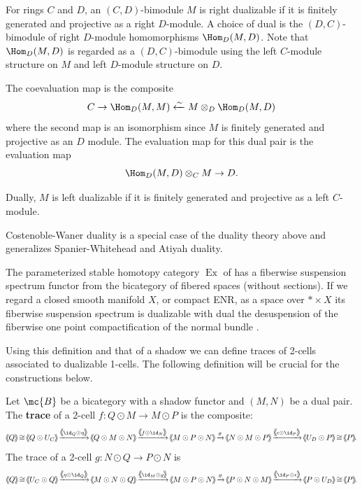 \documentclass[11pt]{amsart}
\newcommand{\xto}{\xrightarrow}
\def\shvar#1#2{{\ensuremath{%
  \hspace{1mm}\makebox[-1mm]{$#1\langle$}\makebox[0mm]{$#1\langle$}\hspace{1mm}%
  {#2}%
  \makebox[1mm]{$#1\rangle$}\makebox[0mm]{$#1\rangle$}%
}}}
\def\sh{\shvar{}}
\begin{document}
\begin{example} 
For rings $C$ and $D$, an $(C,D)$-bimodule $M$ is right dualizable if it is finitely generated and projective as a right $D$-module.  
A choice of dual is the $(D,C)$-bimodule of right $D$-module homomorphisms $\Hom_D(M,D)$.  Note that $\Hom_D(M,D)$ is regarded as a $(D,C)$-bimodule using the left $C$-module structure on $M$ and left $D$-module structure on $D$. 

The coevaluation map is the composite  
\[
  C\to \Hom_D(M,M)\xleftarrow{\sim} M\otimes_D\Hom_D(M,D)
\] 
where
the second map is an isomorphism since $M$ is  finitely generated and projective as an $D$ module. 
The evaluation map for this dual pair is the  evaluation map 
\[
  \Hom_D(M,D)\otimes_C M\to D.
\]

Dually, $M$ is left dualizable if it is finitely generated and projective as a left $C$-module. 
\end{example}

\begin{example}  
Costenoble-Waner duality \cite[Chapter~18]{maysig:pht} is a special case of the duality theory above and generalizes Spanier-Whitehead and Atiyah duality.  

The parameterized stable homotopy category $\operatorname{Ex}$ of \cite{maysig:pht} has a fiberwise suspension spectrum functor  from the bicategory of fibered spaces (without sections).  If we regard a closed smooth manifold $X$, or compact ENR, as a space over $\ast\times X$  its fiberwise suspension spectrum is dualizable with dual the desuspension of the fiberwise one point compactification of the normal bundle \cite[18.5.1]{maysig:pht}. 
\end{example}


Using this definition and that of a shadow we can define traces of 2-cells associated to dualizable 1-cells. The following definition will be crucial for the constructions below.

\begin{defn}\cite{p:thesis}\label{defn:trace}
  Let $\mc{B}$ be a bicategory with a shadow functor and $(M,N)$ be a dual pair.
  The \textbf{trace} of a 2-cell $f\colon Q\odot M\rightarrow M\odot P$ is the composite:
  \[
   \sh{Q}\cong \sh{Q\odot U_C}\xto{\sh{\id_Q\odot\eta}}
  \sh{Q\odot M\odot N} \xto{\sh{f\odot\id_N}}
  \sh{M\odot P\odot N} \xto{\theta}
  \sh{N\odot M\odot P} \xto{\sh{\epsilon \odot \id_P}}
  \sh{U_D\odot P}\cong   \sh{P}.
  \]
The trace of a 2-cell $g\colon N\odot Q\to P\odot N$ is 
  \[
   \sh{Q}\cong \sh{U_C\odot Q}\xto{\sh{\eta\odot\id_Q}}
  \sh{M\odot N\odot Q} \xto{\sh{\id_M\odot g}}
  \sh{M\odot P\odot N} \xto{\theta}
  \sh{P\odot N\odot M} \xto{\sh{\id_P \odot \epsilon}}
    \sh{P\odot U_D}\cong   \sh{P}.
  \]
\end{defn}
\end{document}
